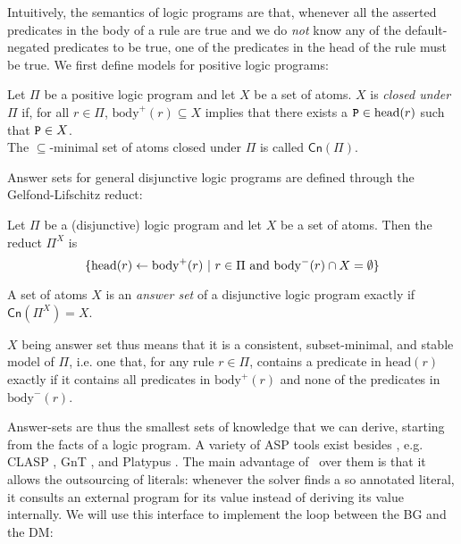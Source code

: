 Intuitively, the semantics of logic programs are that, whenever all the asserted predicates in the body of a rule are true and we do {\em not} know any of the default-negated predicates to be true, one of the predicates in the head of the rule must be true. We first define models for positive logic programs:

\begin{definition}
	Let $\Pi$ be a positive logic program and let $X$ be a set of atoms. $X$ is {\em closed under} $\Pi$ if, for all $r \in \Pi$, $\mathrm{body}^+(r) \subseteq X$ implies that there exists a $\mathtt{P} \in \mathrm{head}(r)$ such that $\mathtt{P} \in X$.\\
	
	\noindent
	The $\subseteq$-minimal set of atoms closed under $\Pi$ is called $\mathsf{Cn}(\Pi)$.
\end{definition}

Answer sets for general disjunctive logic programs are defined through the Gelfond-Lifschitz reduct:

\begin{definition}
Let $\Pi$ be a (disjunctive) logic program and let $X$ be a set of atoms. Then the reduct $\Pi^X$ is
	$$
		\{ \mathrm{head}(r) \leftarrow \mathrm{body}^+(r)\ |\ r \in \Pi \textnormal{ and } \mathrm{body}^-(r) \cap X = \emptyset \}
	$$
\end{definition}

\begin{definition}
	A set of atoms $X$ is an {\em answer set} of a disjunctive logic program exactly if $\mathsf{Cn}(\Pi^X) = X$.
\end{definition}

$X$ being answer set thus means that it is a consistent, subset-minimal, and stable model of $\Pi$, i.e. one that, for any rule $r \in \Pi$, contains a predicate in $\mathrm{head}(r)$ exactly if it contains all predicates in $\mathrm{body}^+(r)$ and none of the predicates in $\mathrm{body}^-(r)$.

Answer-sets are thus the smallest sets of knowledge that we can derive, starting from the facts of a logic program. A variety of ASP tools exist besides \dlvhex, e.g. CLASP \cite{clasp}, GnT \cite{gnt}, and Platypus \cite{platypus}. The main advantage of \dlvhex\ over them is that it allows the outsourcing of literals: whenever the solver finds a so annotated literal, it consults an external program for its value instead of deriving its value internally. We will use this interface to implement the loop between the BG and the DM: 

